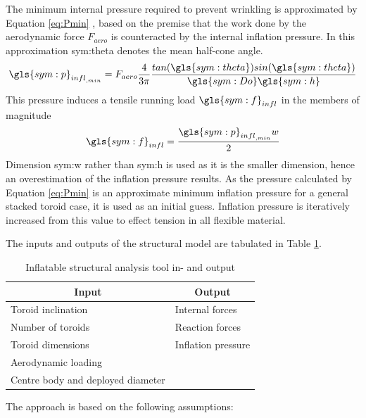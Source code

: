 The minimum internal pressure required to prevent wrinkling is approximated by Equation \ref{eq:Pmin} \cite{Brown2009, Samareh2011}, based on the premise that the work done by the aerodynamic force $F_{aero}$ is counteracted by the internal inflation pressure. In this approximation \gls{sym:theta} denotes the mean half-cone angle.
\begin{equation}
\label{eq:Pmin}
\gls{sym:p}_{{infl}_{,min}} = F_{aero} \frac{4}{3 \pi} \frac{tan(\gls{sym:theta})sin(\gls{sym:theta}) }{\gls{sym:Do}\gls{sym:h}}
\end{equation}
This pressure induces a tensile running load $\gls{sym:f}_{infl}$ in the members of magnitude \cite{Megson2012}
\begin{equation}
\label{eq:Q}
\gls{sym:f}_{infl} =\frac{\gls{sym:p}_{{infl}_{,min}}w}{2}
\end{equation}
Dimension \gls{sym:w} rather than \gls{sym:h} is used as it is the smaller dimension, hence an overestimation of the inflation pressure results. As the pressure calculated by Equation \ref{eq:Pmin} is an approximate minimum inflation pressure for a general stacked toroid case, it is used as an initial guess. Inflation pressure is iteratively increased from this value to effect tension in all flexible material.

The inputs and outputs of the structural model are tabulated in Table \ref{tab:infl}.
\begin{table}[h]
\caption{Inflatable structural analysis tool in- and output}
\centering
\begin{tabular}{|l||l|}
\hline
\multicolumn{1}{|c||}{{\bf Input}} & \multicolumn{1}{c|}{{\bf Output}} \\ \hline \hline
Toroid inclination                & Internal forces                   \\ \hline
Number of toroids                 & Reaction forces                   \\ \hline
Toroid dimensions                 & Inflation pressure                \\ \hline
Aerodynamic loading               &                                   \\ \hline
Centre body and deployed diameter  &                                   \\ \hline
\end{tabular}
\label{tab:infl}
\end{table}

The approach is based on the following assumptions:

